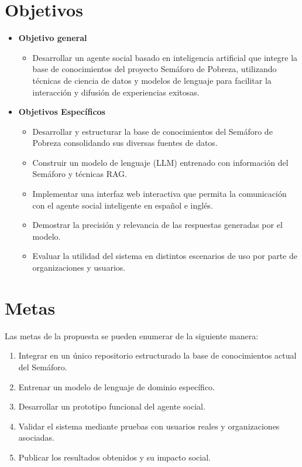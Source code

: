 \documentclass{article}
\begin{document}
\section{Objetivos}\label{sec:objetivos}
\begin{itemize}
 \item \textbf{Objetivo general}
   \begin{itemize}
     \item Desarrollar un agente social basado en inteligencia artificial que integre la base de conocimientos del proyecto Semáforo de Pobreza, utilizando técnicas de ciencia de datos y modelos de lenguaje para facilitar la interacción y difusión de experiencias exitosas.
   \end{itemize}
 \item \textbf{Objetivos Específicos}
   \begin{itemize}
    \item Desarrollar y estructurar la base de conocimientos del Semáforo de Pobreza consolidando sus diversas fuentes de datos.
    \item Construir un modelo de lenguaje (LLM) entrenado con información del Semáforo y técnicas RAG.
    \item Implementar una interfaz web interactiva que permita la comunicación con el agente social inteligente en español e inglés.
    \item Demostrar la precisión y relevancia de las respuestas generadas por el modelo.
    \item Evaluar la utilidad del sistema en distintos escenarios de uso por parte de organizaciones y usuarios.
   \end{itemize}
\end{itemize}

\section{Metas}\label{sec:metas}
Las metas de la propuesta se pueden enumerar de la siguiente manera:
\begin{enumerate}
    \item Integrar en un único repositorio estructurado la base de conocimientos actual del Semáforo.
    \item Entrenar un modelo de lenguaje de dominio específico.
    \item Desarrollar un prototipo funcional del agente social.
    \item Validar el sistema mediante pruebas con usuarios reales y organizaciones asociadas.
    \item Publicar los resultados obtenidos y su impacto social.
\end{enumerate}
\end{document}
